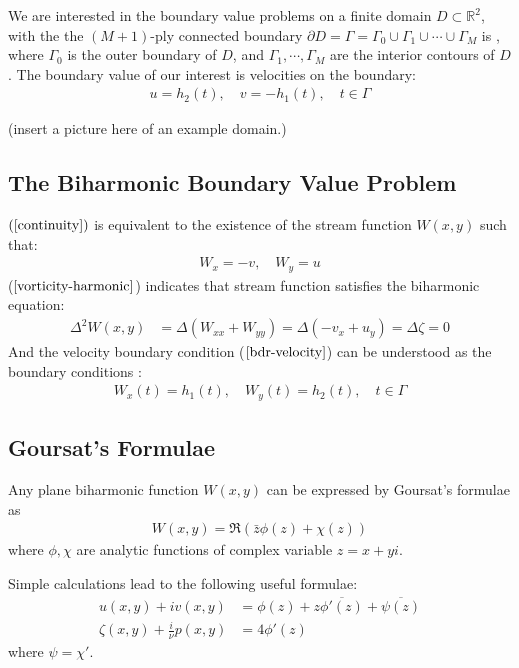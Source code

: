 \documentclass[11pt]{article}
\newtheorem[L]{thm}{Theorem}[section]
\begin{document}
We are interested in the boundary value problems on a finite domain $D\subset \mathbb R^2$, with the the $(M+1)$-ply connected boundary $\partial D =  \Gamma = \Gamma_0 \cup \Gamma_1 \cup \cdots \cup \Gamma_M$ is , where $\Gamma_0$ is the outer boundary of $D$, and $\Gamma_1,\cdots, \Gamma_M$ are the interior contours of $D$. The boundary value of our interest is velocities on the boundary: 
\begin{align}
  u = h_2(t),\quad v = - h_1(t), \quad t\in \Gamma
  \label{bdr-velocity}
\end{align}

(insert a picture here of an example domain.)


\subsection{The Biharmonic Boundary Value Problem}


$(\ref{continuity})$ is equivalent to the existence of the stream function $W(x,y)$ such that:
\begin{align}
  W_x = -v, \quad W_y = u \label{stream-1}
\end{align}
($\ref{vorticity-harmonic}$) indicates that stream function satisfies the biharmonic equation:
\begin{align}
  \Delta^2 W(x,y) 
  &= \Delta (W_{xx} + W_{yy}) = \Delta (-v_{x} + u_{y}) = \Delta \zeta = 0 
  \label{stream-2}
\end{align}
And the velocity boundary condition ($\ref{bdr-velocity}$) can be understood as the boundary conditions :
\begin{align}
  W_x(t) = h_1(t), \quad W_y(t) = h_2(t), \quad t\in \Gamma
  \label{stream-bv}
\end{align}

\subsection{Goursat's Formulae}

Any plane biharmonic function $W(x,y)$ can be expressed by Goursat's formulae as 
\begin{align}
  W(x,y) = \Re (\bar z \phi(z) + \chi (z)) \label{Goursat}
\end{align}
where $\phi, \chi$ are analytic functions of complex variable $z = x+yi$. 

Simple calculations lead to the following useful formulae:
\begin{align}
    u(x,y) + iv(x,y) 
    &= \phi(z) + z \overline{\phi'(z)} + \overline{\psi(z)}
    \label{g-velocity}\\
  \zeta(x,y) + \frac i\nu p(x,y) &= 4\phi'(z) \label{g-vorticity}
\end{align} where $\psi = \chi'$. 
\end{document}
